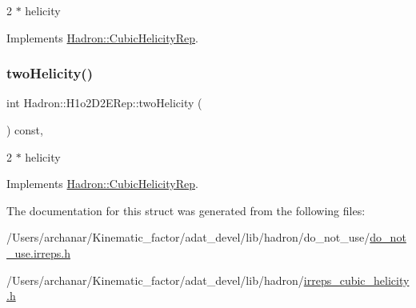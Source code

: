 2 $\ast$ helicity 

Implements \mbox{\hyperlink{structHadron_1_1CubicHelicityRep_af507aa56fc2747eacc8cb6c96db31ecc}{Hadron\+::\+Cubic\+Helicity\+Rep}}.

\mbox{\label{structHadron_1_1H1o2D2ERep_a77a9c97dc4d7a120053dfb21794122ef}} 
\subsubsection{\texorpdfstring{twoHelicity()}{twoHelicity()}\hspace{0.1cm}{\footnotesize\ttfamily [2/2]}}
{\footnotesize\ttfamily int Hadron\+::\+H1o2\+D2\+E\+Rep\+::two\+Helicity (\begin{DoxyParamCaption}{ }\end{DoxyParamCaption}) const\hspace{0.3cm}{\ttfamily [inline]}, {\ttfamily [virtual]}}

2 $\ast$ helicity 

Implements \mbox{\hyperlink{structHadron_1_1CubicHelicityRep_af507aa56fc2747eacc8cb6c96db31ecc}{Hadron\+::\+Cubic\+Helicity\+Rep}}.



The documentation for this struct was generated from the following files\+:\begin{DoxyCompactItemize}
\item 
/\+Users/archanar/\+Kinematic\+\_\+factor/adat\+\_\+devel/lib/hadron/do\+\_\+not\+\_\+use/\mbox{\hyperlink{do__not__use_8irreps_8h}{do\+\_\+not\+\_\+use.\+irreps.\+h}}\item 
/\+Users/archanar/\+Kinematic\+\_\+factor/adat\+\_\+devel/lib/hadron/\mbox{\hyperlink{lib_2hadron_2irreps__cubic__helicity_8h}{irreps\+\_\+cubic\+\_\+helicity.\+h}}\end{DoxyCompactItemize}
